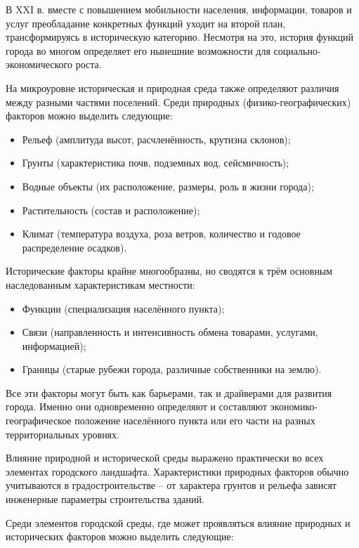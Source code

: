 \documentclass[
  11pt,
  russian,
]{book}
\providecommand{\tightlist}{%
  \setlength{\itemsep}{0pt}\setlength{\parskip}{0pt}}
\begin{document}
В XXI в. вместе с повышением мобильности населения, информации, товаров и услуг преобладание конкретных функций уходит на второй план, трансформируясь в историческую категорию. Несмотря на это, история функций города во многом определяет его нынешние возможности для социально-экономического роста.

На микроуровне историческая и природная среда также определяют различия между разными частями поселений. Среди природных (физико-географических) факторов можно выделить следующие:

\begin{itemize}
\tightlist
\item
  Рельеф (амплитуда высот, расчленённость, крутизна склонов);
\item
  Грунты (характеристика почв, подземных вод, сейсмичность);
\item
  Водные объекты (их расположение, размеры, роль в жизни города);
\item
  Растительность (состав и расположение);
\item
  Климат (температура воздуха, роза ветров, количество и годовое распределение осадков).
\end{itemize}

Исторические факторы крайне многообразны, но сводятся к трём основным наследованным характеристикам местности:

\begin{itemize}
\tightlist
\item
  Функции (специализация населённого пункта);
\item
  Связи (направленность и интенсивность обмена товарами, услугами, информацией);
\item
  Границы (старые рубежи города, различные собственники на землю).
\end{itemize}

Все эти факторы могут быть как барьерами, так и драйверами для развития города. Именно они одновременно определяют и составляют экономико-географическое положение населённого пункта или его части на разных территориальных уровнях.

Влияние природной и исторической среды выражено практически во всех элементах городского ландшафта. Характеристики природных факторов обычно учитываются в градостроительстве -- от характера грунтов и рельефа зависят инженерные параметры строительства зданий.

Среди элементов городской среды, где может проявляться влияние природных и исторических факторов можно выделить следующие:
\end{document}
